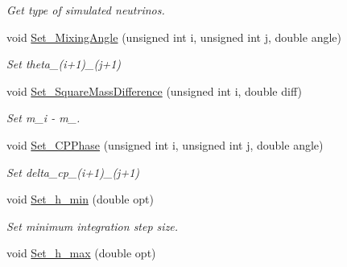 \begin{DoxyCompactItemize}
\begin{DoxyCompactList}\small\item\em Get type of simulated neutrinos. \end{DoxyCompactList}\item 
void \hyperlink{structcudanusquids_1_1ParameterObject_a645693f56eddd689c03638a2964471a0}{Set\+\_\+\+Mixing\+Angle} (unsigned int i, unsigned int j, double angle)\hypertarget{structcudanusquids_1_1ParameterObject_a645693f56eddd689c03638a2964471a0}{}\label{structcudanusquids_1_1ParameterObject_a645693f56eddd689c03638a2964471a0}

\begin{DoxyCompactList}\small\item\em Set theta\+\_\+(i+1)\+\_\+(j+1) \end{DoxyCompactList}\item 
void \hyperlink{structcudanusquids_1_1ParameterObject_ad1dbef9b9fac22a2ce4dd915a163ac0b}{Set\+\_\+\+Square\+Mass\+Difference} (unsigned int i, double diff)\hypertarget{structcudanusquids_1_1ParameterObject_ad1dbef9b9fac22a2ce4dd915a163ac0b}{}\label{structcudanusquids_1_1ParameterObject_ad1dbef9b9fac22a2ce4dd915a163ac0b}

\begin{DoxyCompactList}\small\item\em Set m\+\_\+i -\/ m\+\_. \end{DoxyCompactList}\item 
void \hyperlink{structcudanusquids_1_1ParameterObject_a4845e30d03dadc06b2fb60214bb5fbdc}{Set\+\_\+\+C\+P\+Phase} (unsigned int i, unsigned int j, double angle)\hypertarget{structcudanusquids_1_1ParameterObject_a4845e30d03dadc06b2fb60214bb5fbdc}{}\label{structcudanusquids_1_1ParameterObject_a4845e30d03dadc06b2fb60214bb5fbdc}

\begin{DoxyCompactList}\small\item\em Set delta\+\_\+cp\+\_\+(i+1)\+\_\+(j+1) \end{DoxyCompactList}\item 
void \hyperlink{structcudanusquids_1_1ParameterObject_aa34064317183e0bf496448a9242531a0}{Set\+\_\+h\+\_\+min} (double opt)\hypertarget{structcudanusquids_1_1ParameterObject_aa34064317183e0bf496448a9242531a0}{}\label{structcudanusquids_1_1ParameterObject_aa34064317183e0bf496448a9242531a0}

\begin{DoxyCompactList}\small\item\em Set minimum integration step size. \end{DoxyCompactList}\item 
void \hyperlink{structcudanusquids_1_1ParameterObject_a38adbc8f7d32e0224448f38e8d703774}{Set\+\_\+h\+\_\+max} (double opt)\hypertarget{structcudanusquids_1_1ParameterObject_a38adbc8f7d32e0224448f38e8d703774}{}\label{structcudanusquids_1_1ParameterObject_a38adbc8f7d32e0224448f38e8d703774}


\end{DoxyCompactItemize}
